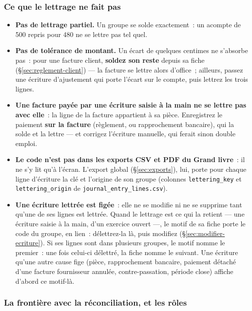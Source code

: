 \documentclass[a4paper,11pt,oneside]{article}
\begin{document}
\subsubsection{Ce que le lettrage ne fait pas}

\begin{itemize}
    \item \textbf{Pas de lettrage partiel.} Un groupe se solde exactement~: un acompte de 500
          repris pour 480 ne se lettre pas tel quel.
    \item \textbf{Pas de tolérance de montant.} Un écart de quelques centimes ne s'absorbe pas~:
          pour une facture client, \textbf{soldez son reste} depuis sa fiche
          (\S\ref{sec:reglement-client}) --- la facture se lettre alors d'office~; ailleurs,
          passez une écriture d'ajustement qui porte l'écart sur le compte, puis lettrez les trois
          lignes.
    \item \textbf{Une facture payée par une écriture saisie à la main ne se lettre pas avec
          elle}~: la ligne de la facture appartient à sa pièce. Enregistrez le paiement
          \textbf{sur la facture} (règlement, ou rapprochement bancaire), qui la solde et la
          lettre --- et corrigez l'écriture manuelle, qui ferait sinon double emploi.
    \item \textbf{Le code n'est pas dans les exports CSV et PDF du Grand livre}~: il ne s'y
          lit qu'à l'écran. L'export global (\S\ref{sec:exports}), lui, porte pour chaque ligne d'écriture
          la clé et l'origine de son groupe (colonnes \texttt{lettering\_key} et
          \texttt{lettering\_origin} de \texttt{journal\_entry\_lines.csv}).
    \item \textbf{Une écriture lettrée est figée}~: elle ne se modifie ni ne se supprime tant
          qu'une de ses lignes est lettrée. Quand le lettrage est ce qui la retient --- une
          écriture saisie à la main, d'un exercice ouvert ---, le motif de sa fiche porte le code
          du groupe, en lien~: délettrez-la là, puis modifiez (\S\ref{sec:modifier-ecriture}).
          Si ses lignes sont dans plusieurs groupes, le motif nomme le premier~: une fois celui-ci
          délettré, la fiche nomme le suivant. Une écriture qu'une autre cause fige (pièce,
          rapprochement bancaire, paiement détaché d'une facture fournisseur annulée,
          contre-passation, période close) affiche d'abord ce motif-là.
\end{itemize}

\subsubsection{La frontière avec la réconciliation, et les rôles}\label{sec:lettrage-frontiere}
\end{document}
